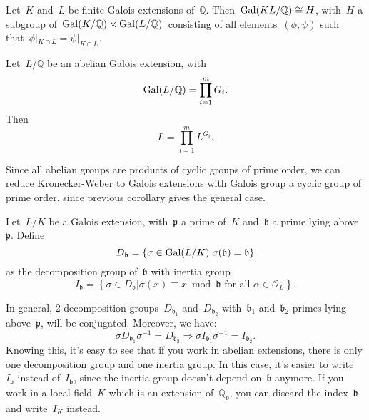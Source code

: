 \begin{theorem}
  Let~$K$ and~$L$ be finite Galois extensions of~$\mathbb{Q}$. Then~$\operatorname{Gal}(KL/\mathbb{Q}) \cong H$, with~$H$ a subgroup of~$\operatorname{Gal}(K/\mathbb{Q}) \times \operatorname{Gal}(L/\mathbb{Q})$ consisting of all elements~$(\phi,\psi)$ such that~$\phi|_{K \cap L} = \psi|_{K \cap L}$.
\end{theorem}

\begin{corollary}
  Let~$L/\mathbb{Q}$ be an abelian Galois extension, with
  \begin{equation}
    \operatorname{Gal}(L/\mathbb{Q}) = \prod_{i=1}^m G_i. 
  \end{equation}
  Then
  \begin{equation}
    L = \prod_{i=1}^m L^{G_i}. 
  \end{equation}
\end{corollary}

Since all abelian groups are products of cyclic groups of prime order, we can reduce Kronecker-Weber to Galois extensions with Galois group a cyclic group of prime order, since previous corollary gives the general case.

\begin{definition}
  Let~$L/K$ be a Galois extension, with~$\mathfrak{p}$ a prime of~$K$ and~$\mathfrak{b}$ a prime lying above~$\mathfrak{p}$. Define
  \begin{equation}
    D_\mathfrak{b}=\left\{\sigma \in \operatorname{Gal}(L/K)|\sigma(\mathfrak{b}) = \mathfrak{b}\right\}
  \end{equation}
  as the decomposition group of~$\mathfrak{b}$ with inertia group
  \begin{equation}
    I_\mathfrak{b} = \left\{\sigma \in D_\mathfrak{b}|\sigma(x) \equiv x \bmod \mathfrak{b} \text{ for all } \alpha \in \mathcal{O}_L\right\}.
  \end{equation}
\end{definition}

In general, 2 decomposition groups~$D_{\mathfrak{b}_1}$ and~$D_{\mathfrak{b}_2}$ with~$\mathfrak{b}_1$ and~$\mathfrak{b}_2$ primes lying above~$\mathfrak{p}$, will be conjugated. Moreover, we have: 
\begin{equation}
  \sigma D_{\mathfrak{b}_1} \sigma^{-1} = D_{\mathfrak{b}_2} \Rightarrow \sigma I_{\mathfrak{b}_1} \sigma^{-1} = I_{\mathfrak{b}_2}.
\end{equation}
Knowing this, it's easy to see that if you work in abelian extensions, there is only one decomposition group and one inertia group. In this case, it's easier to write~$I_{\mathfrak{p}}$ instead of~$I_{\mathfrak{b}}$, since the inertia group doesn't depend on~$\mathfrak{b}$ anymore.
If you work in a local field~$K$ which is an extension of~$\mathbb{Q}_p$, you can discard the index~$\mathfrak{b}$ and write~$I_K$ instead.

